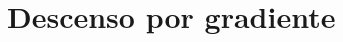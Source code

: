 \documentclass[12pt,a4paper]{book}
\begin{document}
\renewcommand{\contentsname}{\vspace{0cm} Contenido \vspace{-2cm}}
\chapter{Descenso por gradiente}

\end{document}

